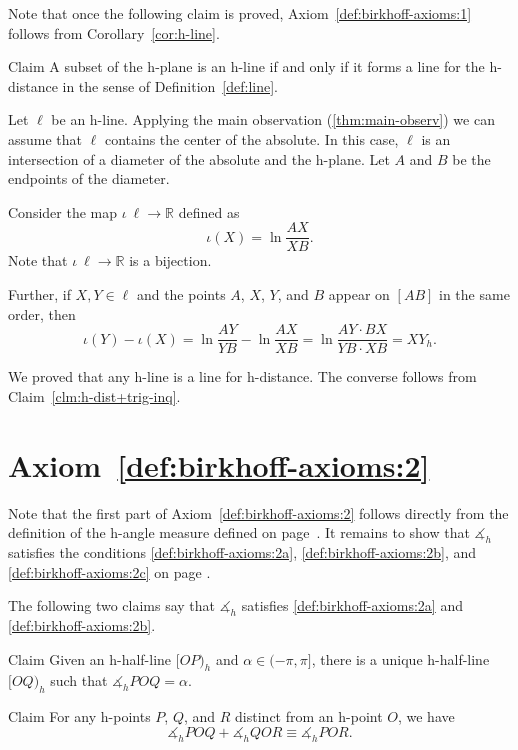 Note that once the following claim is proved,
Axiom~\ref{def:birkhoff-axioms:1} 
follows from Corollary~\ref{cor:h-line}.

\begin{thm}{Claim}
A subset of the h-plane is an h-line if and only if it forms a line for the h-distance in the sense of Definition~\ref{def:line}.
\end{thm}

Let $\ell$ be an h-line.
Applying the main observation (\ref{thm:main-observ}) we can assume that $\ell$ contains the center of the absolute.
In this case, $\ell$ is an intersection of a diameter of the absolute and the h-plane.
Let $A$ and $B$ be the endpoints of the diameter.

Consider the map $\iota\:\ell\to \mathbb{R}$ defined as
$$\iota(X)=\ln \frac{AX}{XB}.$$
Note that $\iota\:\ell\to \mathbb{R}$ is a bijection.

Further, if $X,Y\in \ell$ and the points $A$, $X$, $Y$, and $B$ appear on $[AB]$ in the same order, then
\[\iota(Y)-\iota(X)=\ln \frac{AY}{YB}-\ln \frac{AX}{XB}=\ln \frac{AY\cdot BX}{YB\cdot XB}=XY_h.\]

We proved that any h-line is a line for h-distance.
The converse follows from Claim~\ref{clm:h-dist+trig-inq}.
\qeds


\section*{Axiom~\ref{def:birkhoff-axioms:2}}

Note that the first part of Axiom~\ref{def:birkhoff-axioms:2} follows directly from the definition of the h-angle measure defined on page~\pageref{h-angle measure}.
It remains to show that $\measuredangle_h$ satisfies the conditions \ref{def:birkhoff-axioms:2a}, \ref{def:birkhoff-axioms:2b}, and \ref{def:birkhoff-axioms:2c} on page \pageref{def:birkhoff-axioms:2b}.

The following two claims say that
$\measuredangle_h$ satisfies
 \ref{def:birkhoff-axioms:2a} and \ref{def:birkhoff-axioms:2b}.

\begin{thm}{Claim}\label{clm:h2a}
Given an h-half-line $[O P)_h$ and $\alpha\in(-\pi,\pi]$, there is a unique h-half-line $[O Q)_h$ such that $\measuredangle_h P O Q= \alpha$.
\end{thm}

\begin{thm}{Claim}\label{clm:h2b}
For any h-points $P$, $Q$, and $R$ distinct from an h-point $O$, we have
$$\measuredangle_h P O Q+\measuredangle_h Q O R
\equiv\measuredangle_h P O R.$$

\end{thm}

